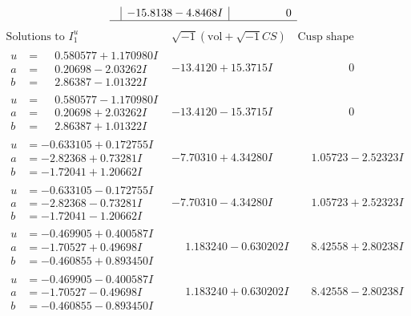 \documentclass[1p]{elsarticle_modified}
\theoremstyle{definition}
\newcommand{\I}{\sqrt{-1}}
\begin{document}
$$\begin{array}{c|c|c}
 & -15.8138 - 4.8468 I & \phantom{-0.000000 } 0\\
 \hline 
 \end{array}$$\newpage$$\begin{array}{c|c|c}  
\text{Solutions to }I^u_{1}& \I (\text{vol} + \sqrt{-1}CS) & \text{Cusp shape}\\
 \hline 
\begin{aligned}
u &= \phantom{-}0.580577 + 1.170980 I \\
a &= \phantom{-}0.20698 - 2.03262 I \\
b &= \phantom{-}2.86387 - 1.01322 I\end{aligned}
 & -13.4120 + 15.3715 I & \phantom{-0.000000 } 0 \\ \hline\begin{aligned}
u &= \phantom{-}0.580577 - 1.170980 I \\
a &= \phantom{-}0.20698 + 2.03262 I \\
b &= \phantom{-}2.86387 + 1.01322 I\end{aligned}
 & -13.4120 - 15.3715 I & \phantom{-0.000000 } 0 \\ \hline\begin{aligned}
u &= -0.633105 + 0.172755 I \\
a &= -2.82368 + 0.73281 I \\
b &= -1.72041 + 1.20662 I\end{aligned}
 & -7.70310 + 4.34280 I & \phantom{-}1.05723 - 2.52323 I \\ \hline\begin{aligned}
u &= -0.633105 - 0.172755 I \\
a &= -2.82368 - 0.73281 I \\
b &= -1.72041 - 1.20662 I\end{aligned}
 & -7.70310 - 4.34280 I & \phantom{-}1.05723 + 2.52323 I \\ \hline\begin{aligned}
u &= -0.469905 + 0.400587 I \\
a &= -1.70527 + 0.49698 I \\
b &= -0.460855 + 0.893450 I\end{aligned}
 & \phantom{-}1.183240 - 0.630202 I & \phantom{-}8.42558 + 2.80238 I \\ \hline\begin{aligned}
u &= -0.469905 - 0.400587 I \\
a &= -1.70527 - 0.49698 I \\
b &= -0.460855 - 0.893450 I\end{aligned}
 & \phantom{-}1.183240 + 0.630202 I & \phantom{-}8.42558 - 2.80238 I \\ \hline\begin{aligned}

\end{aligned}
\end{array}$$
\end{document}
